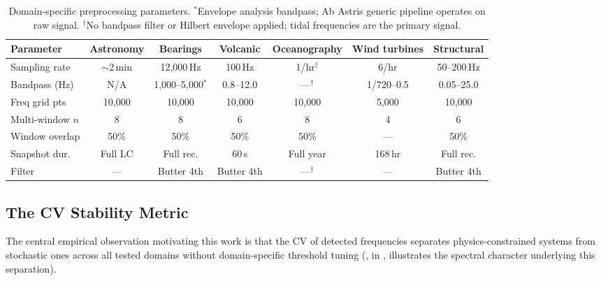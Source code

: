 \documentclass[11pt,a4paper]{article}
\begin{document}
\begin{table}[htbp]
\centering
\caption{Domain-specific preprocessing parameters. $^*$Envelope analysis bandpass; Ab Astris generic pipeline operates on raw signal. $^\dagger$No bandpass filter or Hilbert envelope applied; tidal frequencies are the primary signal.}
\label{tab:params}
\smallskip
\footnotesize
\setlength{\tabcolsep}{4pt}
\begin{tabular}{lcccccc}
\toprule
\textbf{Parameter} & \textbf{Astronomy} & \textbf{Bearings} & \textbf{Volcanic} & \textbf{Oceanography} & \textbf{Wind turbines} & \textbf{Structural} \\
\midrule
Sampling rate      & ${\sim}$2\,min & 12{,}000\,Hz & 100\,Hz    & 1/hr$^\dagger$  & 6/hr        & 50--200\,Hz \\
Bandpass (Hz)      & N/A            & 1{,}000--5{,}000$^*$ & 0.8--12.0 & ---$^\dagger$ & 1/720--0.5  & 0.05--25.0 \\
Freq grid pts      & 10{,}000       & 10{,}000     & 10{,}000   & 10{,}000        & 5{,}000     & 10{,}000 \\
Multi-window $n$   & 8              & 8            & 6          & 8               & 4           & 6 \\
Window overlap     & 50\%           & 50\%         & 50\%       & 50\%            & ---         & 50\% \\
Snapshot dur.      & Full LC        & Full rec.    & 60\,s      & Full year       & 168\,hr     & Full rec. \\
Filter             & ---            & Butter 4th   & Butter 4th & ---$^\dagger$   & ---         & Butter 4th \\
\bottomrule
\end{tabular}
\end{table}

\subsection{The CV Stability Metric}
\label{sec:cv-metric}

The central empirical observation motivating this work is that the CV of detected frequencies separates physics-constrained systems from stochastic ones across all tested domains without domain-specific threshold tuning (, in , illustrates the spectral character underlying this separation).
\end{document}

